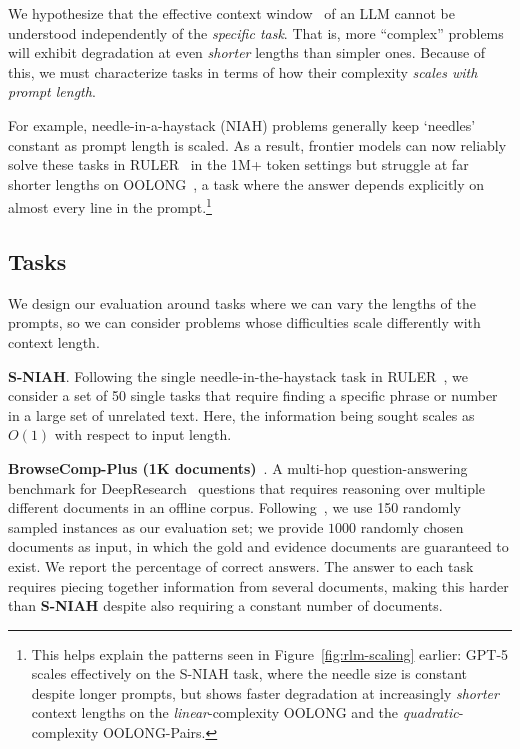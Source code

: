 We hypothesize that the effective context window~\citep{hsieh2024rulerwhatsrealcontext, goldman2025reallylongcontextneed, hong2025contextrot} of an LLM cannot be understood independently of the \textit{specific task}. That is, more ``complex'' problems will exhibit degradation at even \textit{shorter} lengths than simpler ones. Because of this, we must characterize tasks in terms of how their complexity \textit{scales with prompt length}.

For example, needle-in-a-haystack (NIAH) problems generally keep `needles' constant as prompt length is scaled. As a result, frontier models can now reliably solve these tasks in RULER~\citep{hsieh2024rulerwhatsrealcontext} in the 1M+ token settings but struggle at far shorter lengths on OOLONG~\citep{bertsch2025oolongevaluatinglongcontext}, a task where the answer depends explicitly on almost every line in the prompt.\footnote{This helps explain the patterns seen in Figure~\ref{fig:rlm-scaling} earlier: \mbox{GPT-5} scales effectively on the S-NIAH task, where the needle size is constant despite longer prompts, but shows faster degradation at increasingly \textit{shorter} context lengths on the \textit{linear}-complexity OOLONG and the \textit{quadratic}-complexity OOLONG-Pairs.}











\subsection{Tasks}
\label{sec4.1-experimental-setup}
We design our evaluation around tasks where we can vary the lengths of the prompts, so we can consider problems whose difficulties scale differently with context length.



\textbf{S-NIAH}. Following the single needle-in-the-haystack task in RULER~\citep{hsieh2024rulerwhatsrealcontext}, we consider a set of 50 single tasks that require finding a specific phrase or number in a large set of unrelated text. Here, the information being sought scales as $O(1)$ with respect to input length.

\textbf{BrowseComp-Plus (1K documents)}~\citep{chen2025browsecompplusfairtransparentevaluation}. A multi-hop question-answering benchmark for DeepResearch~\citep{OpenAI_DeepResearch_2025} questions that requires reasoning over multiple different documents in an offline corpus. Following~\citet{sun2025scalinglonghorizonllmagent}, we use 150 randomly sampled instances as our evaluation set; we provide $1000$ randomly chosen documents as input, in which the gold and evidence documents are guaranteed to exist. We report the percentage of correct answers. The answer to each task requires piecing together information from several documents, making this harder than \textbf{S-NIAH} despite also requiring a constant number of documents. %

